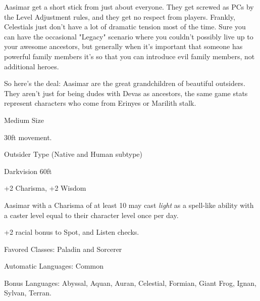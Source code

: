 
Aasimar get a short stick from just about everyone. They get screwed as PCs by the Level Adjustment rules, and they get no respect from players. Frankly, Celestials just don't have a lot of dramatic tension most of the time. Sure you can have the occasional "Legacy" scenario where you couldn't possibly live up to your awesome ancestors, but generally when it's important that someone has powerful family members it's so that you can introduce evil family members, not additional heroes.

So here's the deal: Aasimar are the great grandchildren of beautiful outsiders. They aren't just for being dudes with Devas as ancestors, the same game stats represent characters who come from Erinyes or Marilith stalk. 

\begin{itemize*}
\item Medium Size
\item 30ft movement.
\item Outsider Type (Native and Human subtype)
\item Darkvision 60ft
\item +2 Charisma, +2 Wisdom
\item Aasimar with a Charisma of at least 10 may cast \textit{light} as a spell-like ability with a caster level equal to their character level once per day.
\item +2 racial bonus to Spot, and Listen checks.
\item Favored Classes: Paladin and Sorcerer
\item Automatic Languages: Common
\item Bonus Languages: Abyssal, Aquan, Auran, Celestial, Formian, Giant Frog, Ignan, Sylvan, Terran. 
\end{itemize*}
